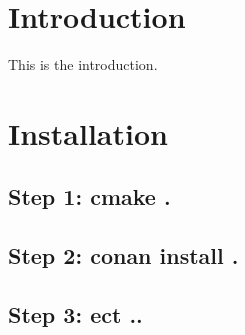 \hypertarget{index_intro_sec}{}\section{Introduction}\label{index_intro_sec}
This is the introduction.\hypertarget{index_install_sec}{}\section{Installation}\label{index_install_sec}
\hypertarget{index_step1}{}\subsection{Step 1\+: cmake .}\label{index_step1}
\hypertarget{index_step2}{}\subsection{Step 2\+: conan install .}\label{index_step2}
\hypertarget{index_step3}{}\subsection{Step 3\+: ect ..}\label{index_step3}
